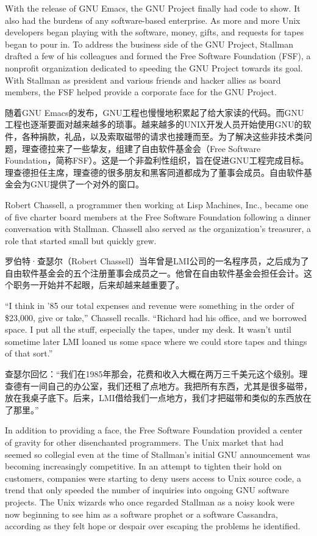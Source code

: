 \ifdefined\eng
With the release of GNU Emacs, the GNU Project finally had code to show. It also had the burdens of any software-based enterprise. As more and more Unix developers began playing with the software, money, gifts, and requests for tapes began to pour in. To address the business side of the GNU Project, Stallman drafted a few of his colleagues and formed the Free Software Foundation (FSF), a nonprofit organization dedicated to speeding the GNU Project towards its goal. With Stallman as president and various friends and hacker allies as board members, the FSF helped provide a corporate face for the GNU Project.
\fi

\ifdefined\chs
随着GNU Emacs的发布，GNU工程也慢慢地积累起了给大家读的代码。而GNU工程也逐渐要面对越来越多的琐事。越来越多的UNIX开发人员开始使用GNU的软件，各种捐款，礼品，以及索取磁带的请求也接踵而至。为了解决这些非技术类问题，理查德拉来了一些挚友，组建了自由软件基金会（Free Software Foundation，简称FSF）。这是一个非盈利性组织，旨在促进GNU工程完成目标。理查德担任主席，理查德的很多朋友和黑客同道都成为了董事会成员。自由软件基金会为GNU提供了一个对外的窗口。
\fi

\ifdefined\eng
Robert Chassell, a programmer then working at Lisp Machines, Inc., became one of five charter board members at the Free Software Foundation following a dinner conversation with Stallman. Chassell also served as the organization's treasurer, a role that started small but quickly grew.
\fi

\ifdefined\chs
罗伯特·查瑟尔（Robert Chassell）当年曾是LMI公司的一名程序员，之后成为了自由软件基金会的五个注册董事会成员之一。他曾在自由软件基金会担任会计。这个职务一开始并不起眼，后来却越来越重要了。
\fi

\ifdefined\eng
``I think in '85 our total expenses and revenue were something in the order of \$23,000, give or take,'' Chassell recalls. ``Richard had his office, and we borrowed space. I put all the stuff, especially the tapes, under my desk. It wasn't until sometime later LMI loaned us some space where we could store tapes and things of that sort.''
\fi

\ifdefined\chs
查瑟尔回忆：``我们在1985年那会，花费和收入大概在两万三千美元这个级别。理查德有一间自己的办公室，我们还租了点地方。我把所有东西，尤其是很多磁带，放在我桌子底下。后来，LMI借给我们一点地方，我们才把磁带和类似的东西放在了那里。''
\fi

\ifdefined\eng
In addition to providing a face, the Free Software Foundation provided a center of gravity for other disenchanted programmers. The Unix market that had seemed so collegial even at the time of Stallman's initial GNU announcement was becoming increasingly competitive. In an attempt to tighten their hold on customers, companies were starting to deny users access to Unix source code, a trend that only speeded the number of inquiries into ongoing GNU software projects. The Unix wizards who once regarded Stallman as a noisy kook were now beginning to see him as a software prophet or a software Cassandra, according as they felt hope or despair over escaping the problems he identified.
\fi

